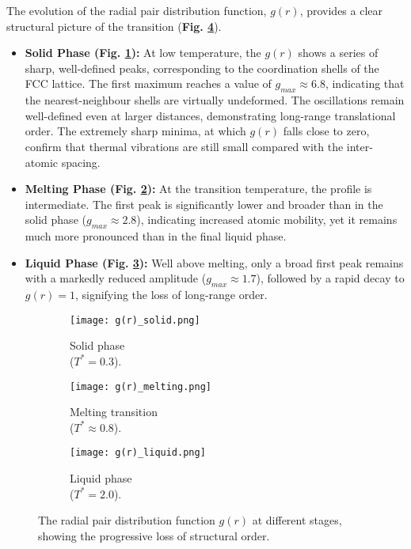 \documentclass{article}
\begin{document}
The evolution of the radial pair distribution function, $g(r)$, provides a clear structural picture of the transition (\textbf{Fig. \ref{fig:gr_all}}).
\begin{itemize}
    \item \textbf{Solid Phase (Fig. \ref{fig:gr_solid}):} At low temperature, the $g(r)$ shows a series of sharp, well-defined peaks, corresponding to the coordination shells of the FCC lattice. The first maximum reaches a value of $g_{max} \approx 6.8$, indicating that the nearest-neighbour shells are virtually undeformed. The oscillations remain well-defined even at larger distances, demonstrating long-range translational order. The extremely sharp minima, at which $g(r)$ falls close to zero, confirm that thermal vibrations are still small compared with the inter-atomic spacing.
    \item \textbf{Melting Phase (Fig. \ref{fig:gr_melting}):} At the transition temperature, the profile is intermediate. The first peak is significantly lower and broader than in the solid phase ($g_{max} \approx 2.8$), indicating increased atomic mobility, yet it remains much more pronounced than in the final liquid phase. 
    \item \textbf{Liquid Phase (Fig. \ref{fig:gr_liquid}):} Well above melting, only a broad first peak remains with a markedly reduced amplitude ($g_{max} \approx 1.7$), followed by a rapid decay to $g(r)=1$, signifying the loss of long-range order.
\end{itemize}

\begin{figure}[h!]
    \centering
    \begin{subfigure}{.7\textwidth}
        \texttt{[image: g(r)\_solid.png]} 
        \caption{Solid phase \\($T^*=0.3$).}
        \label{fig:gr_solid}
    \end{subfigure}
    \begin{subfigure}{.7\textwidth}
        \texttt{[image: g(r)\_melting.png]}
        \caption{Melting transition \\($T^* \approx 0.8$).}
        \label{fig:gr_melting}
    \end{subfigure}
    \begin{subfigure}{.7\textwidth}
        \texttt{[image: g(r)\_liquid.png]} 
        \caption{Liquid phase \\($T^*=2.0$).}
        \label{fig:gr_liquid}
    \end{subfigure}
    \caption{The radial pair distribution function $g(r)$ at different stages, showing the progressive loss of structural order.}
    \label{fig:gr_all}
\end{figure}
\end{document}
